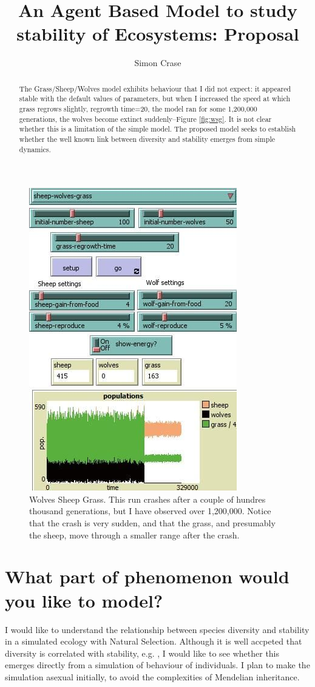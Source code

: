 \documentclass[]{article}
\title{An Agent Based Model to study stability of Ecosystems: Proposal}
\author{Simon Crase}
\begin{document}
\maketitle

\begin{abstract}
The Grass/Sheep/Wolves model \cite{Wilensky:1997} exhibits behaviour that I did not expect: it appeared stable with the default values of parameters, but when I increased the speed at which grass regrows slightly, regrowth time=20, the model ran for some 1,200,000 generations, the wolves become extinct suddenly--Figure \ref{fig:wsg}. It is not clear whether this is a limitation of the simple model.  The proposed model seeks to establish whether the well known link between diversity and stability emerges from simple dynamics.
\end{abstract}

\begin{figure}[b]
	\centering
	\includegraphics[width=0.5\linewidth]{wsg20.jpg}
	\caption{Wolves Sheep Grass. This run crashes after a couple of hundres thousand generations, but I have observed over 1,200,000. Notice that the crash is very sudden, and that the grass, and presumably the sheep, move through a smaller range after the crash.}
	\label{fig:wsg}
\end{figure}

\section{What part of phenomenon would you like to model?}

I would like to understand the relationship between species diversity and stability in a simulated ecology with Natural Selection. Although it is well accpeted that diversity is correlated with stability, e.g. \cite{cleland:2011}, I would like to see whether this emerges directly from a simulation of behaviour of individuals. I plan to make the simulation asexual initially, to avoid the complexities of Mendelian inheritance.
\end{document}
